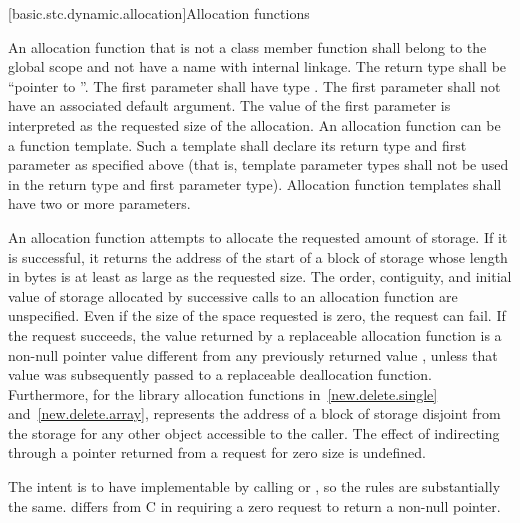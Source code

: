 
[basic.stc.dynamic.allocation]{Allocation functions}

\pnum
{}%
An allocation function that is not a class member function
shall belong to the global scope and not have a name with internal linkage.
The return type shall be ``pointer to ''. The first
parameter shall have type . The
first parameter shall not have an associated default
argument. The value of the first parameter
is interpreted as the requested size of the allocation. An allocation
function can be a function template. Such a template shall declare its
return type and first parameter as specified above (that is, template
parameter types shall not be used in the return type and first parameter
type). Allocation function templates shall have two or more parameters.

\pnum
An allocation function attempts to allocate the requested amount of
storage. If it is successful, it returns the address of the start
of a block of storage whose length in bytes is at least as large
as the requested size.
The order,
contiguity, and initial value of storage allocated by successive calls
to an allocation function are unspecified.
Even if the size of the space
requested is zero, the request can fail. If the request succeeds, the
value returned by a replaceable allocation function
is a non-null pointer value
 different from any previously returned value ,
unless that value  was subsequently passed to a
replaceable deallocation function.
Furthermore, for the library allocation functions
in~\ref{new.delete.single} and~\ref{new.delete.array},
 represents the address of a block of storage disjoint from the storage
for any other object accessible to the caller.
The effect of indirecting through a pointer
returned from a request for zero size is undefined.
\begin{footnote}
The intent is
to have  implementable by
calling  or , so the rules are
substantially the same. \Cpp{} differs from C in requiring a zero request
to return a non-null pointer.
\end{footnote}

